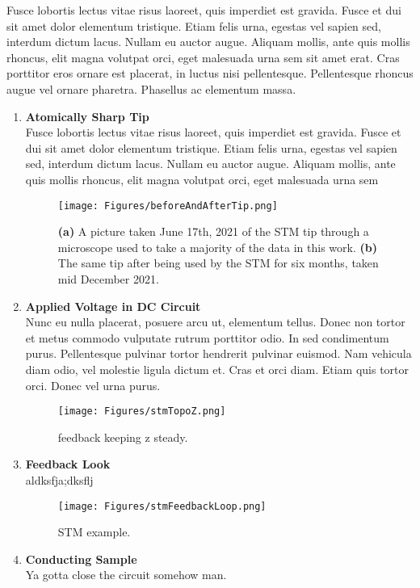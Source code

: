 Fusce lobortis lectus vitae risus laoreet, quis imperdiet est gravida. Fusce et dui sit amet dolor elementum tristique. Etiam felis urna, egestas vel sapien sed, interdum dictum lacus. Nullam eu auctor augue. Aliquam mollis, ante quis mollis rhoncus, elit magna volutpat orci, eget malesuada urna sem sit amet erat. Cras porttitor eros ornare est placerat, in luctus nisi pellentesque. Pellentesque rhoncus augue vel ornare pharetra. Phasellus ac elementum massa.

	\begin{enumerate}
		\item \textbf{Atomically Sharp Tip} \\ Fusce lobortis lectus vitae risus laoreet, quis imperdiet est gravida. Fusce et dui sit amet dolor elementum tristique. Etiam felis urna, egestas vel sapien sed, interdum dictum lacus. Nullam eu auctor augue. Aliquam mollis, ante quis mollis rhoncus, elit magna volutpat orci, eget malesuada urna sem
		
    		\begin{figure}[!h]
        		\centering
        		\texttt{[image: Figures/beforeAndAfterTip.png]}
        		\caption{\textbf{(a)} A picture taken June 17th, 2021 of the STM tip through a microscope used to take a majority of the data in this work. \textbf{(b)} The same tip after being used by the STM for six months, taken mid December 2021.}
        		\label{fig:beforeAndAfter}
    		\end{figure}    
    
		\item \textbf{Applied Voltage in DC Circuit} \\ Nunc eu nulla placerat, posuere arcu ut, elementum tellus. Donec non tortor et metus commodo vulputate rutrum porttitor odio. In sed condimentum purus. Pellentesque pulvinar tortor hendrerit pulvinar euismod. Nam vehicula diam odio, vel molestie ligula dictum et. Cras et orci diam. Etiam quis tortor orci. Donec vel urna purus.
		
			\begin{figure}[!h]
        		\centering
        		\texttt{[image: Figures/stmTopoZ.png]}
        		\caption{feedback keeping z steady.}
        		\label{fig:stm}
    		\end{figure}
		
		\item \textbf{Feedback Look} \\ aldksfja;dksflj
		
    		\begin{figure}[!h]
        		\centering
        		\texttt{[image: Figures/stmFeedbackLoop.png]}
        		\caption{STM example.}
        		\label{fig:stmCircuit}
    		\end{figure}
		
		\item \textbf{Conducting Sample} \\ Ya gotta close the circuit somehow man.
	\end{enumerate}


